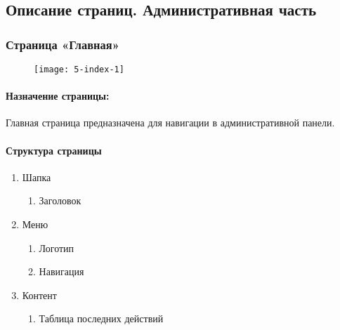 \subsection{Описание страниц. Административная часть}
\subsubsection{Страница «Главная»}
\begin{figure}[H]
\texttt{[image: 5-index-1]}
\end{figure}
\paragraph{Назначение страницы:}
Главная страница предназначена для навигации в административной панели.

\paragraph{Структура страницы}
\begin{enumerate}
	\item Шапка
	\begin{enumerate}
		\item Заголовок
	\end{enumerate}

	\item Меню
	\begin{enumerate}
		\item  Логотип
		\item  Навигация
	\end{enumerate}

	\item  Контент
	\begin{enumerate}
		\item  Таблица последних действий
	\end{enumerate}
\end{enumerate}

